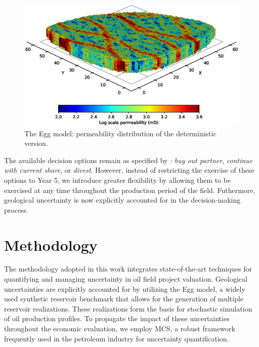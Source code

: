 \documentclass[pdflatex,sn-basic]{sn-jnl}%
\theoremstyle{thmstyleone}%
\theoremstyle{thmstyletwo}%
\theoremstyle{thmstylethree}%
\begin{document}
\begin{figure}[H]
\centering
\begin{minipage}{0.95\textwidth}
  \includegraphics[width=\textwidth]{egg_model_log_3D.eps}
  \caption{The Egg model: permeability distribution of the deterministic version.}
  \label{fig1}
\end{minipage}
\end{figure}

The available decision options remain as specified by \cite{ref12a}: \textit{buy out partner}, \textit{continue with current share}, or \textit{divest}. However, instead of restricting the exercise of these options to Year 5, we introduce greater flexibility by allowing them to be exercised at any time throughout the production period of the field. Futhermore, geological uncertainty is now explicitly accounted for in the decision-making process.


\section{Methodology}\label{sec4}

The methodology adopted in this work integrates state-of-the-art techniques for quantifying and managing uncertainty in oil field project valuation. Geological uncertainties are explicitly accounted for by utilizing the Egg model, a widely used synthetic reservoir benchmark that allows for the generation of multiple reservoir realizations. These realizations form the basis for stochastic simulation of oil production profiles. To propagate the impact of these uncertainties throughout the economic evaluation, we employ MCS, a robust framework frequently used in the petroleum industry for uncertainty quantification.
\end{document}
